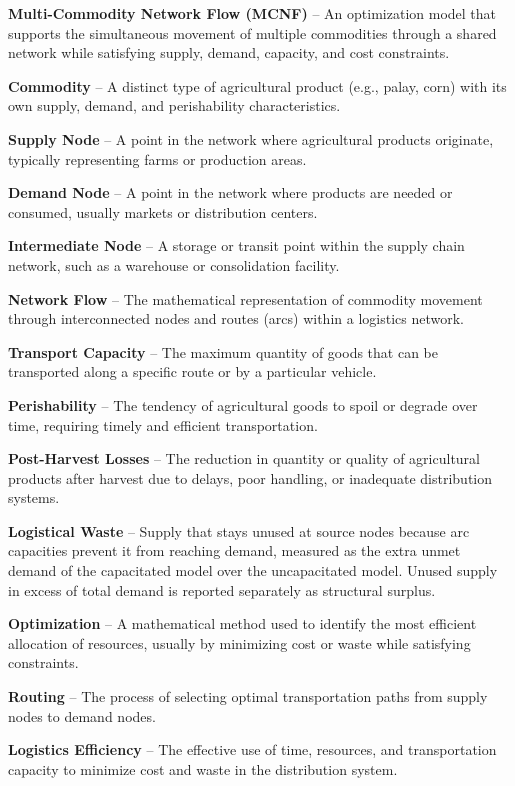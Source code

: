 \documentclass{icsthesis}
\begin{document}
\begin{mainmatter}
\textbf{Multi-Commodity Network Flow (MCNF)} – An optimization model that supports the simultaneous movement of multiple commodities through a shared network while satisfying supply, demand, capacity, and cost constraints.

\textbf{Commodity} – A distinct type of agricultural product (e.g., palay, corn) with its own supply, demand, and perishability characteristics.

\textbf{Supply Node} – A point in the network where agricultural products originate, typically representing farms or production areas.

\textbf{Demand Node} – A point in the network where products are needed or consumed, usually markets or distribution centers.

\textbf{Intermediate Node} – A storage or transit point within the supply chain network, such as a warehouse or consolidation facility.

\textbf{Network Flow} – The mathematical representation of commodity movement through interconnected nodes and routes (arcs) within a logistics network.

\textbf{Transport Capacity} – The maximum quantity of goods that can be transported along a specific route or by a particular vehicle.

\textbf{Perishability} – The tendency of agricultural goods to spoil or degrade over time, requiring timely and efficient transportation.

\textbf{Post-Harvest Losses} – The reduction in quantity or quality of agricultural products after harvest due to delays, poor handling, or inadequate distribution systems.

\textbf{Logistical Waste} – Supply that stays unused at source nodes because arc capacities prevent it from reaching demand, measured as the extra unmet demand of the capacitated model over the uncapacitated model. Unused supply in excess of total demand is reported separately as structural surplus.

\textbf{Optimization} – A mathematical method used to identify the most efficient allocation of resources, usually by minimizing cost or waste while satisfying constraints.

\textbf{Routing} – The process of selecting optimal transportation paths from supply nodes to demand nodes.

\textbf{Logistics Efficiency} – The effective use of time, resources, and transportation capacity to minimize cost and waste in the distribution system.


\end{mainmatter}
\end{document}
